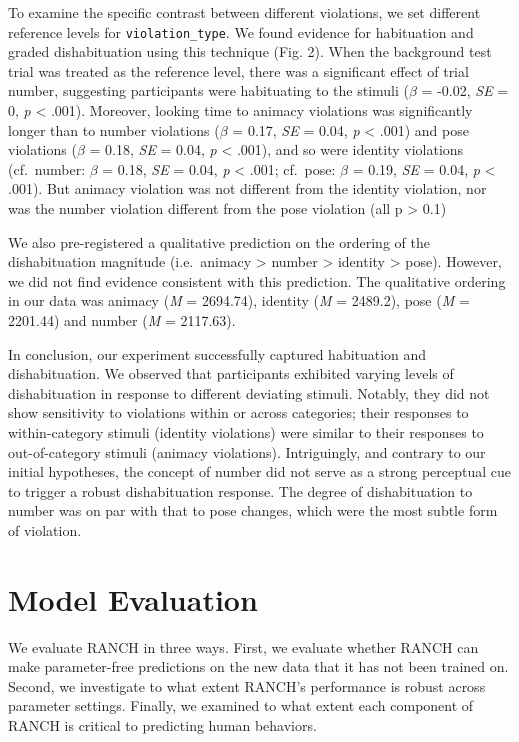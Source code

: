 \documentclass[10pt, letterpaper]{article}
\begin{document}
To examine the specific contrast between different violations, we set
different reference levels for \texttt{violation\_type}. We found
evidence for habituation and graded dishabituation using this technique
(Fig. 2). When the background test trial was treated as the reference
level, there was a significant effect of trial number, suggesting
participants were habituating to the stimuli (\(\beta\) = -0.02,
\emph{SE} = 0, \emph{p} \textless{} .001). Moreover, looking time to
animacy violations was significantly longer than to number violations
(\(\beta\) = 0.17, \emph{SE} = 0.04, \emph{p} \textless{} .001) and pose
violations (\(\beta\) = 0.18, \emph{SE} = 0.04, \emph{p} \textless{}
.001), and so were identity violations (cf.~number: \(\beta\) = 0.18,
\emph{SE} = 0.04, \emph{p} \textless{} .001; cf.~pose: \(\beta\) = 0.19,
\emph{SE} = 0.04, \emph{p} \textless{} .001). But animacy violation was
not different from the identity violation, nor was the number violation
different from the pose violation (all p \textgreater{} 0.1)

We also pre-registered a qualitative prediction on the ordering of the
dishabituation magnitude (i.e.~animacy \textgreater{} number
\textgreater{} identity \textgreater{} pose). However, we did not find
evidence consistent with this prediction. The qualitative ordering in
our data was animacy (\emph{M} = 2694.74), identity (\emph{M} = 2489.2),
pose (\emph{M} = 2201.44) and number (\emph{M} = 2117.63).

In conclusion, our experiment successfully captured habituation and
dishabituation. We observed that participants exhibited varying levels
of dishabituation in response to different deviating stimuli. Notably,
they did not show sensitivity to violations within or across categories;
their responses to within-category stimuli (identity violations) were
similar to their responses to out-of-category stimuli (animacy
violations). Intriguingly, and contrary to our initial hypotheses, the
concept of number did not serve as a strong perceptual cue to trigger a
robust dishabituation response. The degree of dishabituation to number
was on par with that to pose changes, which were the most subtle form of
violation.

\hypertarget{model-evaluation}{%
\section{Model Evaluation}\label{model-evaluation}}

We evaluate RANCH in three ways. First, we evaluate whether RANCH can
make parameter-free predictions on the new data that it has not been
trained on. Second, we investigate to what extent RANCH's performance is
robust across parameter settings. Finally, we examined to what extent
each component of RANCH is critical to predicting human behaviors.
\end{document}
